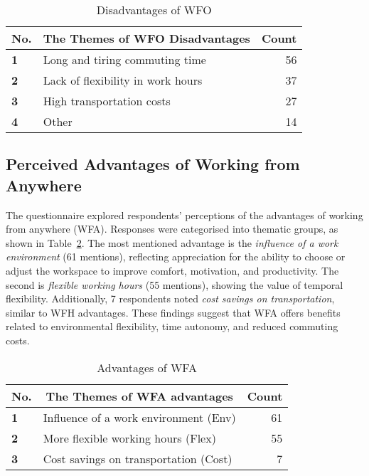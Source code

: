 \documentclass[conference]{IEEEtran}
\begin{document}
\begin{table}[ht]
	\caption{Disadvantages of WFO}
	\label{Disadvantages of WFO}
	\begin{tabular}{|p{}|p{}|r|}
		\hline
		\multicolumn{1}{|c|}{\textbf{No.}} & \multicolumn{1}{c|}{\textbf{The Themes of WFO Disadvantages}} & \multicolumn{1}{c|}{\textbf{Count}} \\ \hline
		\textbf{1}             & Long and tiring commuting time            & 56 %
		\\ \hline
		\textbf{2}             & Lack of flexibility in work hours          & 37 %
		\\ \hline
		\textbf{3}             & High transportation costs              & 27 %
		\\ \hline
		\textbf{4}             & Other          & 14
		\\ \hline
	\end{tabular}
\end{table}


\subsection{Perceived Advantages of Working from Anywhere}
\label{sec:advantage-wfa}

The questionnaire explored respondents' perceptions of the advantages of working from anywhere (WFA). Responses were categorised into thematic groups, as shown in Table~\ref{Advantages of WFA}. The most mentioned advantage is the \textit{influence of a work environment} (61 mentions), reflecting appreciation for the ability to choose or adjust the workspace to improve comfort, motivation, and productivity. The second is \textit{flexible working hours} (55 mentions), showing the value of temporal flexibility. Additionally, 7 respondents noted \textit{cost savings on transportation}, similar to WFH advantages. These findings suggest that WFA offers benefits related to environmental flexibility, time autonomy, and reduced commuting costs.


\begin{table}
	\centering
	\caption{Advantages of WFA}
	\label{Advantages of WFA}
	\begin{tabular}{|p{}|p{}|r|}
		\hline
		\multicolumn{1}{|c|}{\textbf{No.}} & \multicolumn{1}{c|}{\textbf{The Themes of WFA advantages}} & \multicolumn{1}{c|}{\textbf{Count}} \\ \hline
		\textbf{1} & Influence of a work environment (Env) & 61 %
		\\ \hline
		\textbf{2} &  More flexible working hours (Flex)       & 55 %
		\\ \hline
		\textbf{3} & Cost savings on transportation (Cost)      & 7 %
		\\ \hline
	\end{tabular}
\end{table}
\end{document}
